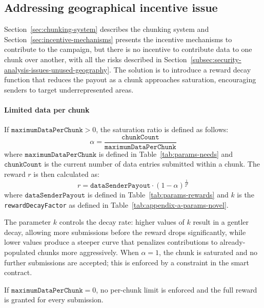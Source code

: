 \subsection{Addressing geographical incentive issue}\label{subsec:addressing-issues-geographical-incentive-issue}
Section~\ref{sec:chunking-system} describes the chunking system and Section~\ref{sec:incentive-mechanisms} presents the incentive mechanisms to contribute to the campaign, but there is no incentive to contribute data to one chunk over another, with all the risks described in Section~\ref{subsec:security-analysis-issues-unused-geography}.
The solution is to introduce a reward decay function that reduces the payout as a chunk approaches saturation, encouraging senders to target underrepresented areas.

\paragraph{Limited data per chunk}
If $\texttt{maximumDataPerChunk} > 0$, the saturation ratio is defined as follows:
\begin{equation}
    \alpha = \frac{\texttt{chunkCount}}{\texttt{maximumDataPerChunk}}
    \label{eq:proto-design-define-alpha-ratio}
\end{equation}
where $\texttt{maximumDataPerChunk}$ is defined in Table~\ref{tab:params-needs} and $\texttt{chunkCount}$ is the current number of data entries submitted within a chunk.
The reward $r$ is then calculated as:
\begin{equation}
    r = \texttt{dataSenderPayout} \cdot (1 - \alpha)^{\frac{1}{2^{k}}}
    \label{eq:proto-design-reward-determination}
\end{equation}
where $\texttt{dataSenderPayout}$ is defined in Table~\ref{tab:params-rewards} and $k$ is the \texttt{rewardDecayFactor} as defined in Table~\ref{tab:appendix-a-params-novel}.

The parameter $k$ controls the decay rate: higher values of $k$ result in a gentler decay, allowing more submissions before the reward drops significantly, while lower values produce a steeper curve that penalizes contributions to already-populated chunks more aggressively.
When $\alpha = 1$, the chunk is saturated and no further submissions are accepted; this is enforced by a constraint in the smart contract.

If $\texttt{maximumDataPerChunk} = 0$, no per-chunk limit is enforced and the full reward is granted for every submission.

